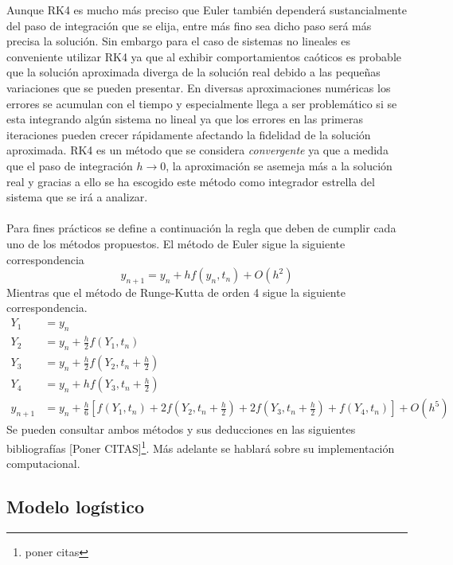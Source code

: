 Aunque RK4 es mucho más preciso que Euler también dependerá sustancialmente del paso de integración que se elija, entre más fino sea dicho paso será más precisa la solución. Sin embargo para el caso de sistemas no lineales es conveniente utilizar RK4 ya que al exhibir comportamientos caóticos es probable que la solución aproximada diverga de la solución real debido a las pequeñas variaciones que se pueden presentar. En diversas aproximaciones numéricas los errores se acumulan con el tiempo y especialmente llega a ser problemático si se esta integrando algún sistema no lineal ya que los errores en las primeras iteraciones pueden crecer rápidamente afectando la fidelidad de la solución aproximada. RK4 es un método que se considera \textit{convergente} ya que a medida que el paso de integración $h\to 0$, la aproximación se asemeja más a la solución real y gracias a ello se ha escogido este método como integrador estrella del sistema que se irá a analizar.\\
\\
Para fines prácticos se define a continuación la regla que deben de cumplir cada uno de los métodos propuestos. El método de Euler sigue la siguiente correspondencia
\begin{equation}\label{eqn:Euler}
	y_{n+1}=y_n+hf(y_n,t_n)+O(h^2)
\end{equation}
Mientras que el método de Runge-Kutta de orden 4 sigue la siguiente correspondencia.
\begin{equation}\label{eqn:RK4}
	\begin{split}
		Y_1 &= y_n\\
		Y_2 &= y_n+\frac{h}{2}f(Y_1,t_n)\\
		Y_3 &= y_n+\frac{h}{2}f\left (Y_2,t_n+\frac{h}{2}\right )\\
		Y_4 &= y_n+hf\left (Y_3,t_n+\frac{h}{2}\right )\\
		y_{n+1} &= y_n+\frac{h}{6}\left [f(Y_1,t_n)+2f\left (Y_2,t_n+\frac{h}{2}\right)+ 2f\left (Y_3,t_n+\frac{h}{2}\right )+f(Y_4,t_n)\right ]+O(h^5)
	\end{split}
\end{equation}
Se pueden consultar ambos métodos y sus deducciones en las siguientes bibliografías [Poner CITAS]\footnote{poner citas}. Más adelante se hablará sobre su implementación computacional.

\subsection{Modelo logístico}

